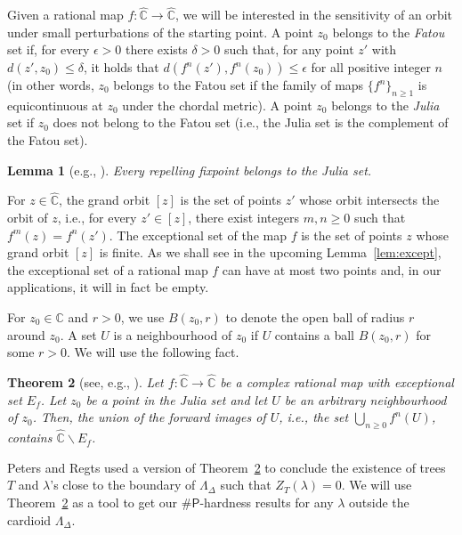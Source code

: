 \documentclass[11pt]{article}
\newtheorem{theorem}{Theorem}
\newtheorem{lemma}[theorem]{Lemma}
\def\numP{\#\mathsf{P}}
\def\Complex{\mathbb{C}}
\def\Riem{\widehat{\Complex}}
\def\LambdaD{\Lambda_\Delta}
\newcommand{\fn}[2]{#1^{#2}}
\newcommand{\eps}{\epsilon}
\begin{document}
Given a rational map $f:\Riem\rightarrow \Riem$, we will be interested in the sensitivity of an orbit under small perturbations of the starting point. A point $z_0$ belongs to the \emph{Fatou} set if, for every $\epsilon>0$ there exists $\delta>0$ such that, for any point $z'$ with $d(z',z_0)\leq \delta$, it holds that $d(\fn{f}{n}(z'),\fn{f}{n}(z_0))\leq \eps$ for all positive integer $n$ (in other words, $z_0$ belongs to the Fatou set if the family of maps $\{\fn{f}{n}\}_{n\geq 1}$ is equicontinuous at $z_0$ under the chordal metric). A point $z_0$ belongs to the \emph{Julia} set if $z_0$ does not belong to the Fatou set (i.e., the Julia set is the complement of the Fatou set).  

\begin{lemma}[e.g., {\cite[Lemma 4.6]{Milnor}}]\label{lem:repelling}
Every repelling fixpoint belongs to the Julia set.
\end{lemma}

For $z\in \Riem$, the grand orbit $[z]$ is the set of points $z'$ whose orbit intersects the orbit of $z$, i.e., for every $z'\in [z]$, there exist integers $m,n\geq 0$ such that $\fn{f}{m}(z)=\fn{f}{n}(z')$. The exceptional set of the map $f$ is the set of points $z$ whose grand orbit $[z]$ is finite. As we shall see in the upcoming Lemma~\ref{lem:except}, the exceptional set of a rational map $f$ can have at most two points and, in our applications, it will in fact be empty. 

For $z_0\in \Complex$ and $r>0$, we use $B(z_0,r)$ to denote the open ball of radius $r$ around $z_0$. A set $U$ is a neighbourhood of $z_0$ if $U$ contains a ball $B(z_0,r)$ for some $r>0$. We will use the following fact.
\begin{theorem}[see, e.g., {\cite[Theorem 4.10]{Milnor}}]\label{thm:bazooka}
Let $f:\Riem\rightarrow \Riem$ be a complex rational map with exceptional set $E_f$. Let $z_0$ be a point in the Julia set and let $U$ be an arbitrary neighbourhood of $z_0$.  Then, the union of the forward images of $U$, i.e., the set $\bigcup_{n\geq 0} \fn{f}{n}(U)$, contains $\Riem\backslash E_f$.
\end{theorem}
Peters and Regts \cite{Peters} used a version of Theorem~\ref{thm:bazooka} to conclude the existence of trees $T$ and $\lambda$'s close to the boundary of $\LambdaD$ such that $Z_T(\lambda)=0$. We will use Theorem~\ref{thm:bazooka} as a tool to get our $\numP$-hardness results for any $\lambda$ outside the cardioid $\LambdaD$.
\end{document}
